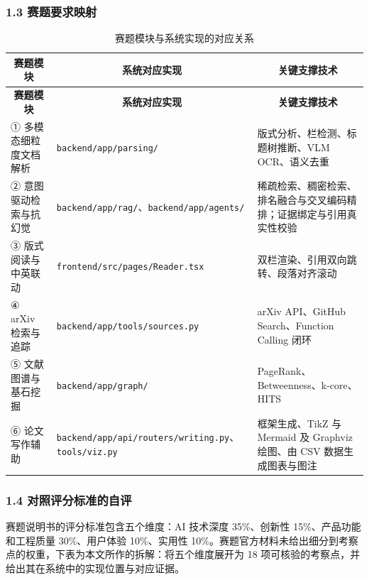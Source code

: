 \documentclass[UTF8,fontset=windows,zihao=5,a4paper]{ctexart}
\begin{document}
\subsubsection*{1.3 赛题要求映射}
\begin{longtable}{@{}p{}p{}p{}@{}}
\caption{赛题模块与系统实现的对应关系}\\
\toprule
\multicolumn{1}{c}{\textbf{赛题模块}} & \multicolumn{1}{c}{\textbf{系统对应实现}} & \multicolumn{1}{c}{\textbf{关键支撑技术}} \\
\midrule
\endfirsthead
\toprule
\multicolumn{1}{c}{\textbf{赛题模块}} & \multicolumn{1}{c}{\textbf{系统对应实现}} & \multicolumn{1}{c}{\textbf{关键支撑技术}} \\
\midrule
\endhead
\bottomrule
\endfoot
① 多模态细粒度文档解析 & \texttt{backend/app/parsing/} & 版式分析、栏检测、标题树推断、VLM OCR、语义去重 \\
② 意图驱动检索与抗幻觉 & \texttt{backend/app/rag/}、\texttt{backend/app/agents/} & 稀疏检索、稠密检索、排名融合与交叉编码精排；证据绑定与引用真实性校验 \\
③ 版式阅读与中英联动 & \texttt{frontend/src/pages/Reader.tsx} & 双栏渲染、引用双向跳转、段落对齐滚动 \\
④ arXiv 检索与追踪 & \texttt{backend/app/tools/sources.py} & arXiv API、GitHub Search、Function Calling 闭环 \\
⑤ 文献图谱与基石挖掘 & \texttt{backend/app/graph/} & PageRank、Betweenness、k-core、HITS \\
⑥ 论文写作辅助 & \texttt{backend/app/api/routers/writing.py}、\texttt{tools/viz.py} & 框架生成、TikZ 与 Mermaid 及 Graphviz 绘图、由 CSV 数据生成图表与图注 \\
\end{longtable}

\subsubsection*{1.4 对照评分标准的自评}
赛题说明书的评分标准包含五个维度：AI 技术深度 35\%、创新性 15\%、产品功能和工程质量 30\%、用户体验 10\%、实用性 10\%。赛题官方材料未给出细分到考察点的权重，下表为本文所作的拆解：将五个维度展开为 18 项可核验的考察点，并给出其在系统中的实现位置与对应证据。
\end{document}
